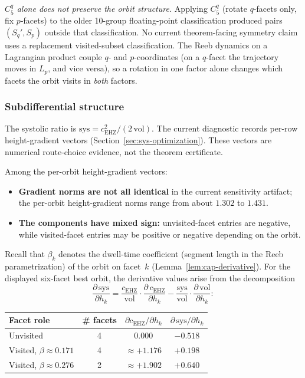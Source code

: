 \emph{$C_5^q$ alone does not preserve the orbit structure.}
Applying $C_5^q$ (rotate $q$-facets only, fix $p$-facets) to the older
10-group floating-point classification produced pairs $(S_q', S_p)$ outside
that classification.  No current theorem-facing symmetry claim uses a
replacement visited-subset classification.
The Reeb dynamics on a Lagrangian product couple $q$- and
$p$-coordinates (on a $q$-facet
the trajectory moves in $L_p$, and vice versa), so a rotation
in one factor alone changes which facets the orbit visits in
\emph{both} factors.

\subsubsection*{Subdifferential structure}

The systolic ratio is $\mathrm{sys} = c_{\mathrm{EHZ}}^2 / (2\,\mathrm{vol})$.
The current diagnostic records per-row height-gradient vectors
(Section~\ref{sec:sys-optimization}).  These vectors are numerical
route-choice evidence, not the theorem certificate.

Among the per-orbit height-gradient vectors:
\begin{itemize}
\item \textbf{Gradient norms are not all identical}
  in the current sensitivity artifact; the per-orbit height-gradient norms
  range from about $1.302$ to $1.431$.
\item \textbf{The components have mixed sign:}
  unvisited-facet entries are negative, while visited-facet entries may be
  positive or negative depending on the orbit.
\end{itemize}

Recall that $\beta_k$ denotes the dwell-time coefficient
(segment length in the Reeb parametrization) of the orbit on
facet~$k$ (Lemma~\ref{lem:cap-derivative}).
For the displayed six-facet best orbit, the derivative values arise from
the decomposition
\[
  \frac{\partial\,\mathrm{sys}}{\partial h_k}
  = \frac{c_{\mathrm{EHZ}}}{\mathrm{vol}} \cdot
    \frac{\partial\,c_{\mathrm{EHZ}}}{\partial h_k}
  - \frac{\mathrm{sys}}{\mathrm{vol}} \cdot
    \frac{\partial\,\mathrm{vol}}{\partial h_k}:
\]
\begin{center}
\begin{tabular}{lccc}
\toprule
Facet role & \# facets &
$\partial c_{\mathrm{EHZ}} / \partial h_k$ &
$\partial\,\mathrm{sys}/\partial h_k$ \\
\midrule
Unvisited & 4 & $0.000$ & $-0.518$ \\
Visited, $\beta \approx 0.171$ & 4 & $\approx {+1.176}$ & $+0.198$ \\
Visited, $\beta \approx 0.276$ & 2 & $\approx {+1.902}$ & $+0.640$ \\
\bottomrule
\end{tabular}
\end{center}

